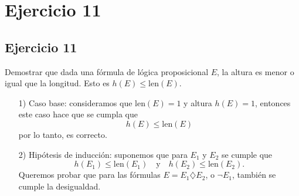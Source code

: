 \chapter*{Ejercicio 11}
\section*{Ejercicio 11}

Demostrar que dada una fórmula de lógica proposicional $E$, la altura es menor o igual que la longitud. Esto es $h(E) \leq \text{len}(E)$. \\

\begin{enumerate}
    \item[1)] Caso base: consideramos que $\text{len}(E) = 1$ y altura $h(E) = 1$, entonces este caso hace que se cumpla que
    \[
    h(E) \leq \text{len}(E)
    \]
    por lo tanto, es correcto.

    \item[2)] Hipótesis de inducción: suponemos que para $E_1$ y $E_2$ se cumple que
    \[
    h(E_1) \leq \text{len}(E_1) \quad \text{y} \quad h(E_2) \leq \text{len}(E_2).
    \]
    Queremos probar que para las fórmulas $E = E_1  \diamondsuit E_2$, o $\neg E_1$, también se cumple la desigualdad.


\end{enumerate}
